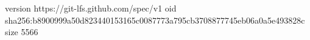 version https://git-lfs.github.com/spec/v1
oid sha256:b8900999a50d823440153165c0087773a795cb3708877745eb06a0a5e493828c
size 5566
